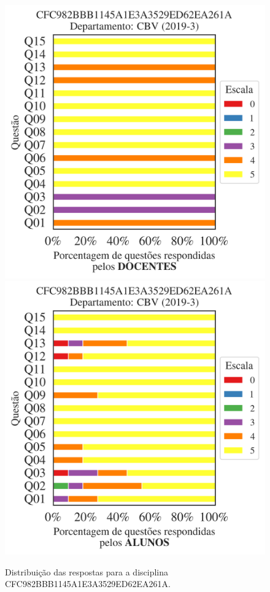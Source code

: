 \documentclass[a4paper,10pt]{article}
\begin{document}
\begin{figure}[h]
\centering
\includegraphics[width=0.485\linewidth]{analise_disciplina_departamento_CBV_CFC982BBB1145A1E3A3529ED62EA261A_docentes.png}
\includegraphics[width=0.485\linewidth]{analise_disciplina_departamento_CBV_CFC982BBB1145A1E3A3529ED62EA261A_alunos.png}
\caption{\label{fig:analise_geral_departamento}                Distribuição das respostas para a disciplina CFC982BBB1145A1E3A3529ED62EA261A. }
\end{figure}
\end{document}
